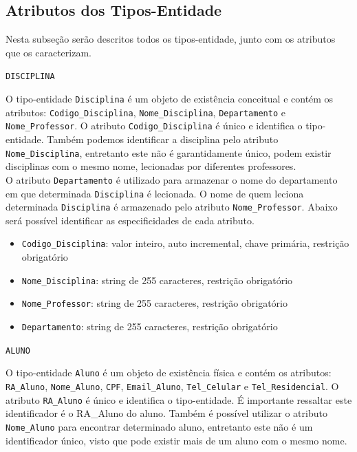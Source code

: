 \documentclass[12pt,a4paper]{article}
\begin{document}
\subsection{Atributos dos Tipos-Entidade} \label{atributos_entidades}

Nesta subseção serão descritos todos os tipos-entidade, junto com os atributos que os caracterizam.

\vspace{0.5cm}
\begin{center}
    \texttt{DISCIPLINA}
\end{center}

\hspace{6}O tipo-entidade {\texttt{Disciplina}} é um objeto de existência conceitual e contém os atributos: {\texttt{Codigo\_Disciplina}}, {\texttt{Nome\_Disciplina}}, {\texttt{Departamento}} e {\texttt{Nome\_Professor}}. O atributo {\texttt{Codigo\_Disciplina}} é único e identifica o tipo-entidade. Também podemos identificar a disciplina pelo atributo {\texttt{Nome\_Disciplina}}, entretanto este não é garantidamente único, podem existir disciplinas com o mesmo nome, lecionadas por diferentes professores.\\

O atributo {\texttt{Departamento}} é utilizado para armazenar o nome do departamento em que determinada \texttt{Disciplina} é lecionada. O nome de quem leciona determinada \texttt{Disciplina} é armazenado pelo atributo {\texttt{Nome\_Professor}}. Abaixo será possível identificar as especificidades de cada atributo. \\

\begin{itemize}
    \item {\texttt{Codigo\_Disciplina}}: valor inteiro, auto incremental, chave primária, restrição obrigatório
    \item {\texttt{Nome\_Disciplina}}: string de 255 caracteres, restrição obrigatório
    \item {\texttt{Nome\_Professor}}: string de 255 caracteres, restrição obrigatório
    \item {\texttt{Departamento}}: string de 255 caracteres, restrição obrigatório
\end{itemize}

\vspace{0.5cm}
\begin{center}
    \texttt{ALUNO}
\end{center}

O tipo-entidade {\texttt{Aluno}} é um objeto de existência física e contém os atributos: {\texttt{RA\_Aluno}}, {\texttt{Nome\_Aluno}}, {\texttt{CPF}}, {\texttt{Email\_Aluno}}, {\texttt{Tel\_Celular} e \texttt{Tel\_Residencial}}. O atributo {\texttt{RA\_Aluno}} é único e identifica o tipo-entidade. É importante ressaltar este identificador é o RA\_Aluno do aluno. Também é possível utilizar o atributo {\texttt{Nome\_Aluno}} para encontrar determinado aluno, entretanto este não é um identificador único, visto que pode existir mais de um aluno com o mesmo nome.\\
\end{document}
